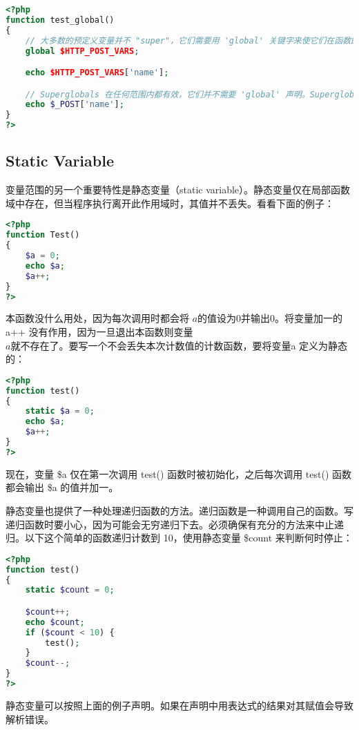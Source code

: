 \begin{lstlisting}[language=PHP]
<?php
function test_global()
{
    // 大多数的预定义变量并不 "super"，它们需要用 'global' 关键字来使它们在函数的本地区域中有效。
    global $HTTP_POST_VARS;

    echo $HTTP_POST_VARS['name'];

    // Superglobals 在任何范围内都有效，它们并不需要 'global' 声明。Superglobals 是在 PHP 4.1.0 引入的。
    echo $_POST['name'];
}
?>
\end{lstlisting}

\subsection{Static Variable}

变量范围的另一个重要特性是静态变量（static variable）。静态变量仅在局部函数域中存在，但当程序执行离开此作用域时，其值并不丢失。看看下面的例子：



\begin{lstlisting}[language=PHP]
<?php
function Test()
{
    $a = 0;
    echo $a;
    $a++;
}
?>
\end{lstlisting}

本函数没什么用处，因为每次调用时都会将 $a 的值设为 0 并输出 0。将变量加一的 $a++ 没有作用，因为一旦退出本函数则变量 $a 就不存在了。要写一个不会丢失本次计数值的计数函数，要将变量 $a 定义为静态的：


\begin{lstlisting}[language=PHP]
<?php
function test()
{
    static $a = 0;
    echo $a;
    $a++;
}
?>
\end{lstlisting}

现在，变量 \$a 仅在第一次调用 test() 函数时被初始化，之后每次调用 test() 函数都会输出 \$a 的值并加一。

静态变量也提供了一种处理递归函数的方法。递归函数是一种调用自己的函数。写递归函数时要小心，因为可能会无穷递归下去。必须确保有充分的方法来中止递归。以下这个简单的函数递归计数到 10，使用静态变量 \$count 来判断何时停止：

\begin{lstlisting}[language=PHP]
<?php
function test()
{
    static $count = 0;

    $count++;
    echo $count;
    if ($count < 10) {
        test();
    }
    $count--;
}
?>
\end{lstlisting}

静态变量可以按照上面的例子声明。如果在声明中用表达式的结果对其赋值会导致解析错误。


